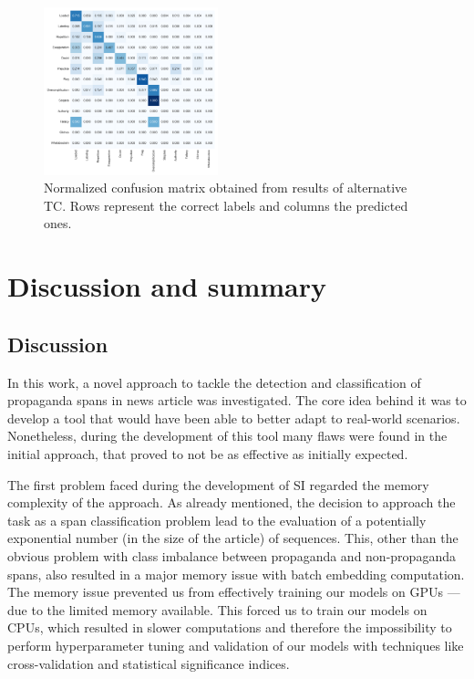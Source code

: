 \documentclass[11pt]{article}
\newcommand{\pol}[1]{{\fontfamily{pcr}\selectfont#1}}
\begin{document}
\begin{figure}[h]
    \centering
    \includegraphics[width=0.45\textwidth]{images/confusion.pdf}
    \caption{Normalized confusion matrix obtained from results of alternative \pol{TC}. Rows represent the correct labels and columns the predicted ones.}
    \label{fig:confusion-mat}
\end{figure}

\section{Discussion and summary}
\subsection{Discussion} \label{sec:discussion}
In this work, a novel approach to tackle the detection and classification of propaganda spans in news article was investigated. The core idea behind it was to develop a tool that would have been able to better adapt to real-world scenarios. 
Nonetheless, during the development of this tool many flaws were found in the initial approach, that proved to not be as effective as initially expected.

The first problem faced during the development of \pol{SI} regarded the memory complexity of the approach. As already mentioned, the decision to approach the task as a span classification problem lead to the evaluation of a potentially exponential number (in the size of the article) of sequences. This, other than the obvious problem with class imbalance between propaganda and non-propaganda spans, also resulted in a major memory issue with batch embedding computation. 
The memory issue prevented us from effectively training our models on GPUs — due to the limited memory available. This forced us to train our models on CPUs, which resulted in slower computations and therefore the impossibility to perform hyperparameter tuning and validation of our models with techniques like cross-validation and statistical significance indices.
\end{document}
